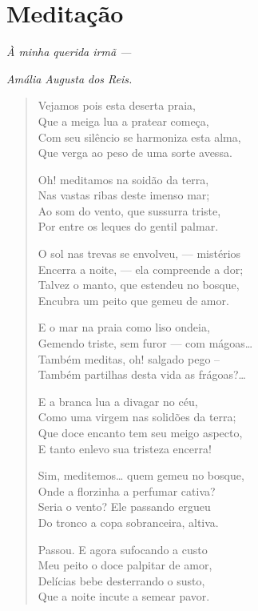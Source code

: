 \chapter{Meditação}

\hfill{}\emph{À minha querida irmã ---}

\hfill{}\emph{Amália Augusta dos Reis.}

\medskip

\begin{verse}
Vejamos pois esta deserta praia,\\
Que a meiga lua a pratear começa,\\
Com seu silêncio se harmoniza esta alma,\\
Que verga ao peso de uma sorte avessa.

Oh! meditamos na soidão da terra,\\
Nas vastas ribas deste imenso mar;\\
Ao som do vento, que sussurra triste,\\
Por entre os leques do gentil palmar.

O sol nas trevas se envolveu, --- mistérios\\
Encerra a noite, --- ela compreende a dor;\\
Talvez o manto, que estendeu no bosque,\\
Encubra um peito que gemeu de amor.

E o mar na praia como liso ondeia,\\
Gemendo triste, sem furor --- com mágoas\ldots{}\\
Também meditas, oh! salgado pego --\\
Também partilhas desta vida as frágoas?\ldots{}

E a branca lua a divagar no céu,\\
Como uma virgem nas solidões da terra;\\
Que doce encanto tem seu meigo aspecto,\\
E tanto enlevo sua tristeza encerra!

Sim, meditemos\ldots{} quem gemeu no bosque,\\
Onde a florzinha a perfumar cativa?\\
Seria o vento? Ele passando ergueu\\
Do tronco a copa sobranceira, altiva.

Passou. E agora sufocando a custo\\
Meu peito o doce palpitar de amor,\\
Delícias bebe desterrando o susto,\\
Que a noite incute a semear pavor.


\end{verse}
